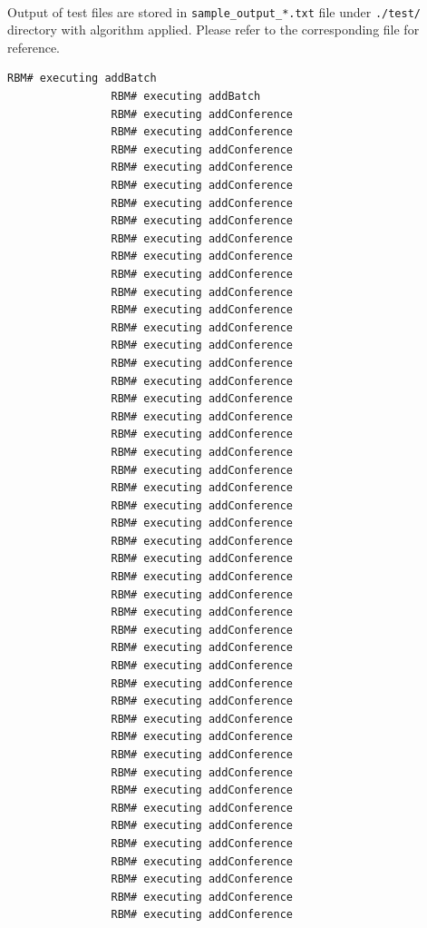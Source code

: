 \documentclass{article}
\begin{document}
            \paragraph{}
                Output of test files are stored in \texttt{sample\_output\_*.txt} file under
                \texttt{./test/} directory with algorithm applied. Please refer to the
                corresponding file for reference.
            \begin{Verbatim}[gobble=8]
                RBM# executing addBatch
                RBM# executing addBatch
                RBM# executing addConference
                RBM# executing addConference
                RBM# executing addConference
                RBM# executing addConference
                RBM# executing addConference
                RBM# executing addConference
                RBM# executing addConference
                RBM# executing addConference
                RBM# executing addConference
                RBM# executing addConference
                RBM# executing addConference
                RBM# executing addConference
                RBM# executing addConference
                RBM# executing addConference
                RBM# executing addConference
                RBM# executing addConference
                RBM# executing addConference
                RBM# executing addConference
                RBM# executing addConference
                RBM# executing addConference
                RBM# executing addConference
                RBM# executing addConference
                RBM# executing addConference
                RBM# executing addConference
                RBM# executing addConference
                RBM# executing addConference
                RBM# executing addConference
                RBM# executing addConference
                RBM# executing addConference
                RBM# executing addConference
                RBM# executing addConference
                RBM# executing addConference
                RBM# executing addConference
                RBM# executing addConference
                RBM# executing addConference
                RBM# executing addConference
                RBM# executing addConference
                RBM# executing addConference
                RBM# executing addConference
                RBM# executing addConference
                RBM# executing addConference
                RBM# executing addConference
                RBM# executing addConference
                RBM# executing addConference
                RBM# executing addConference
                RBM# executing addConference

\end{Verbatim}
\end{document}
